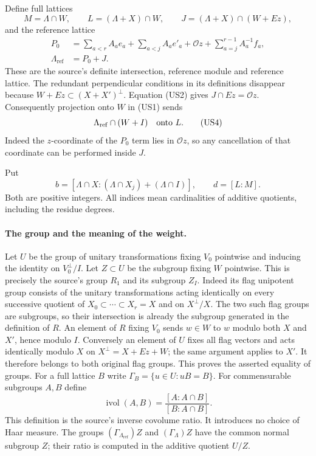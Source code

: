 Define full lattices
\[
 M=\Lambda\cap W,\qquad L=(\Lambda+X)\cap W,\qquad
 J=(\Lambda+X)\cap(W+Ez),
\]
and the reference lattice
\begin{align*}
 P_0&=\sum_{a<r} A_a e_a+\sum_{a<j} A_a e'_a
                      +\mathcal O z+\sum_{a=j}^{r-1}A_a^{-1}f_a,\\
 \Lambda_{\mathrm{ref}}&=P_0+J.
 \tag{US3}
\end{align*}
These are the source's definite intersection, reference
module and reference lattice.  The redundant perpendicular
conditions in its definitions disappear because
$W+Ez\subset(X+X')^\perp$.  Equation (US2) gives
$J\cap Ez=\mathcal O z$.  Consequently projection onto $W$
in (US1) sends
\[
 \Lambda_{\mathrm{ref}}\cap(W+I)\quad\hbox{onto }L.
 \tag{US4}
\]
Indeed the $z$-coordinate of the $P_0$ term lies in
$\mathcal O z$, so any cancellation of that coordinate
can be performed inside $J$.

Put
\[
 b=[\Lambda\cap X:(\Lambda\cap X_j)+(\Lambda\cap I)],
 \qquad d=[L:M].
 \tag{US5}
\]
Both are positive integers.  All indices mean cardinalities
of additive quotients, including the residue degrees.

\paragraph{The group and the meaning of the weight.}
Let $U$ be the group of unitary transformations fixing $V_0$
pointwise and inducing the identity on $V_0^\perp/I$.
Let $Z\subset U$ be the subgroup fixing $W$ pointwise.
This is precisely the source's group $R_1$ and its subgroup
$Z_I$.  Indeed its flag unipotent group consists of the
unitary transformations acting identically on every
successive quotient of $X_0\subset\cdots\subset X_r=X$
and on $X^\perp/X$.  The two such flag groups are
subgroups, so their intersection is already the subgroup
generated in the definition of $R$.  An element of $R$
fixing $V_0$ sends $w\in W$ to $w$ modulo both $X$ and
$X'$, hence modulo $I$.  Conversely an element of $U$
fixes all flag vectors and acts identically modulo $X$
on $X^\perp=X+Ez+W$; the same argument applies to
$X'$.  It therefore belongs to both original flag groups.
This proves the asserted equality of groups.
For a full lattice $B$ write
$\Gamma_B=\{u\in U:uB=B\}$.  For commensurable subgroups
$A,B$ define
\[
 \operatorname{ivol}(A,B)=
            \frac{[A:A\cap B]}{[B:A\cap B]}.
 \tag{US6}
\]
This definition is the source's inverse covolume ratio.  It
introduces no choice of Haar measure.  The groups
$(\Gamma_{\Lambda_{\mathrm{ref}}})Z$ and
$(\Gamma_\Lambda)Z$ have the common normal subgroup $Z$;
their ratio is computed in the additive quotient $U/Z$.

